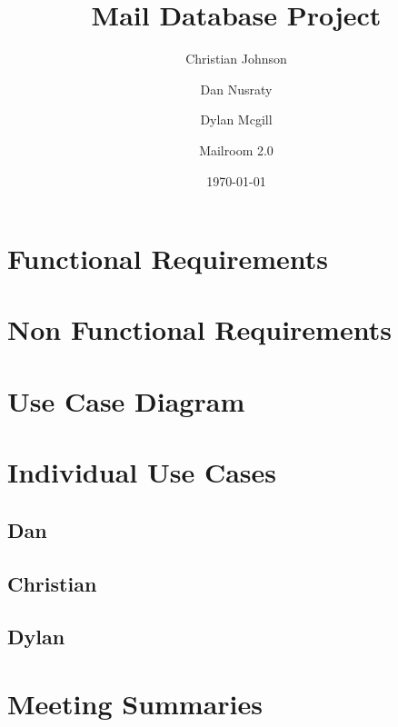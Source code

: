 \documentclass[11pt]{article}
\author{Christian Johnson\and Dan Nusraty\and Dylan Mcgill\and\newline Mailroom 2.0}
\date{\today}
\title{Mail Database Project}
\begin{document}
\maketitle
\tableofcontents

\clearpage
\section{Functional Requirements}
\label{sec:org6b473a9}

\section{Non Functional Requirements}
\label{sec:org823189a}

\section{Use Case Diagram}
\label{sec:orga14e9d8}

\section{Individual Use Cases}
\label{sec:org16cab64}

\subsection{Dan}
\label{sec:org7fa8ae9}

\subsection{Christian}
\label{sec:org70929e7}

\subsection{Dylan}
\label{sec:org8e21265}
\section{Meeting Summaries}
\label{sec:orgb92f047}
\end{document}
